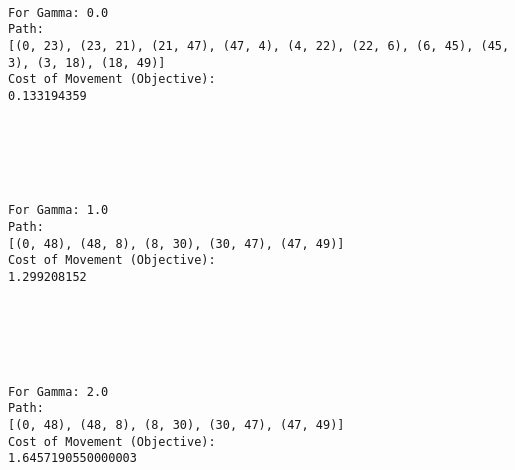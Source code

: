 \documentclass[11pt]{article}
\begin{document}
    \begin{Verbatim}[commandchars=\\\{\}]

For Gamma: 0.0
Path:
[(0, 23), (23, 21), (21, 47), (47, 4), (4, 22), (22, 6), (6, 45), (45, 3), (3, 18), (18, 49)]
Cost of Movement (Objective):
0.133194359

    \end{Verbatim}

    \begin{center}
    \end{center}
    { \hspace*{\fill} \\}
    
    \begin{center}
    \end{center}
    { \hspace*{\fill} \\}
    
    \begin{Verbatim}[commandchars=\\\{\}]

For Gamma: 1.0
Path:
[(0, 48), (48, 8), (8, 30), (30, 47), (47, 49)]
Cost of Movement (Objective):
1.299208152

    \end{Verbatim}

    \begin{center}
    \end{center}
    { \hspace*{\fill} \\}
    
    \begin{center}
    \end{center}
    { \hspace*{\fill} \\}
    
    \begin{Verbatim}[commandchars=\\\{\}]

For Gamma: 2.0
Path:
[(0, 48), (48, 8), (8, 30), (30, 47), (47, 49)]
Cost of Movement (Objective):
1.6457190550000003

    \end{Verbatim}
\end{document}
